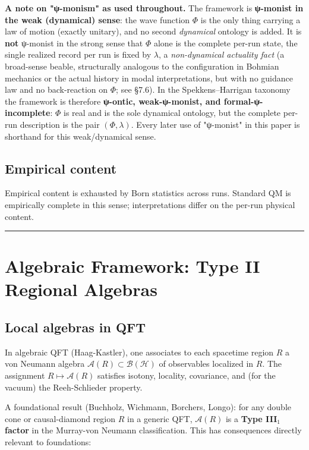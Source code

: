 \documentclass[11pt,a4paper]{article}
\begin{document}
\textbf{A note on "ψ-monism" as used throughout.} The framework is \textbf{ψ-monist in the weak (dynamical) sense}: the wave function $\Phi$ is the only thing carrying a law of motion (exactly unitary), and no second \emph{dynamical} ontology is added. It is \textbf{not} ψ-monist in the strong sense that $\Phi$ alone is the complete per-run state, the single realized record per run is fixed by $\lambda$, a \emph{non-dynamical actuality fact} (a broad-sense beable, structurally analogous to the configuration in Bohmian mechanics or the actual history in modal interpretations, but with no guidance law and no back-reaction on $\Phi$; see §7.6). In the Spekkens–Harrigan taxonomy the framework is therefore \textbf{ψ-ontic, weak-ψ-monist, and formal-ψ-incomplete}: $\Phi$ is real and is the sole dynamical ontology, but the complete per-run description is the pair $(\Phi, \lambda)$. Every later use of "ψ-monist" in this paper is shorthand for this weak/dynamical sense.

\subsection{Empirical content}

Empirical content is exhausted by Born statistics across runs. Standard QM is empirically complete in this sense; interpretations differ on the per-run physical content.

\medskip\hrule\medskip

\section{Algebraic Framework: Type II Regional Algebras}

\subsection{Local algebras in QFT}

In algebraic QFT (Haag-Kastler), one associates to each spacetime region $R$ a von Neumann algebra $\mathcal{A}(R) \subset \mathcal{B}(\mathcal{H})$ of observables localized in $R$. The assignment $R \mapsto \mathcal{A}(R)$ satisfies isotony, locality, covariance, and (for the vacuum) the Reeh-Schlieder property.

A foundational result (Buchholz, Wichmann, Borchers, Longo): for any double cone or causal-diamond region $R$ in a generic QFT, $\mathcal{A}(R)$ is a \textbf{Type III$_1$ factor} in the Murray-von Neumann classification. This has consequences directly relevant to foundations:
\end{document}
